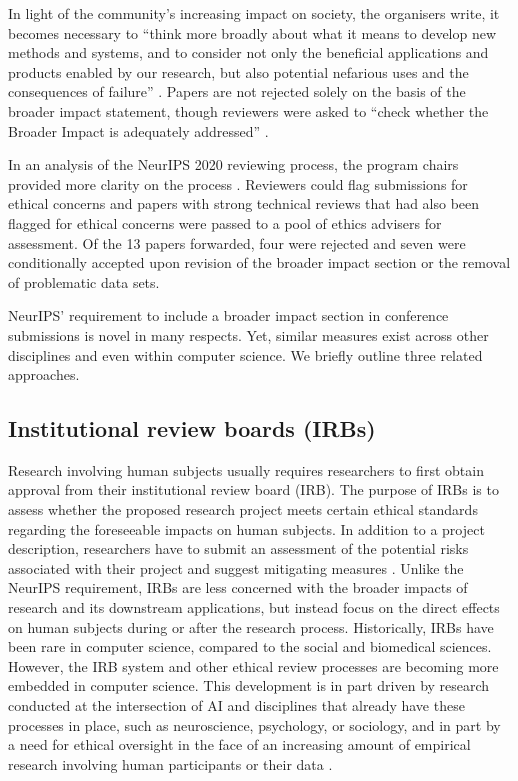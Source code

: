 \documentclass[11pt,english]{article}
\begin{document}
	In light of the community's increasing impact on society, the organisers write, it becomes necessary to ``think more broadly about what it means to develop new methods and systems, and to consider not only the beneficial applications and products enabled by our research, but also potential nefarious uses and the consequences of failure'' \citep{NeurIPS_getting_2020}. Papers are not rejected solely on the basis of the broader impact statement, though reviewers were asked to ``check whether the Broader Impact is adequately addressed'' \citep{neurips_faq_neurips_2020}. 
	
	In an analysis of the NeurIPS 2020 reviewing process, the program chairs provided more clarity on the process \citep{lin_what_2020}. Reviewers could flag submissions for ethical concerns and papers with strong technical reviews that had also been flagged for ethical concerns were passed to a pool of ethics advisers for assessment. Of the 13 papers forwarded, four were rejected and seven were conditionally accepted upon revision of the broader impact section or the removal of problematic data sets.
	
	NeurIPS' requirement to include a broader impact section in conference submissions is novel in many respects. Yet, similar measures exist across other disciplines and even within computer science. We briefly outline three related approaches.
	
	\subsection*{Institutional review boards (IRBs)}
	
	Research involving human subjects usually requires researchers to first obtain approval from their institutional review board (IRB). The purpose of IRBs is to assess whether the proposed research project meets certain ethical standards regarding the foreseeable impacts on human subjects. In addition to a project description, researchers have to submit an assessment of the potential risks associated with their project and suggest mitigating measures \citep{hamburger_new_2004}. Unlike the NeurIPS requirement, IRBs are less concerned with the broader impacts of research and its downstream applications, but instead focus on the direct effects on human subjects during or after the research process. Historically, IRBs have been rare in computer science, compared to the social and biomedical sciences. However, the IRB system and other ethical review processes are becoming more embedded in computer science. This development is in part driven by research conducted at the intersection of AI and disciplines that already have these processes in place, such as neuroscience, psychology, or sociology, and in part by a need for ethical oversight in the face of an increasing amount of empirical research involving human participants or their data \citep{buchanan_computer_2011,amorim_submit_2019}.
	
\end{document}
